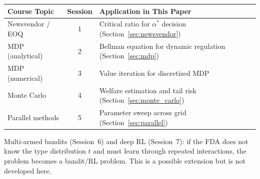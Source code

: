 \documentclass[12pt,a4paper]{article}
\begin{document}
\begin{center}
\renewcommand{\arraystretch}{1.3}
\begin{tabular}{l|c|l}
\textbf{Course Topic} & \textbf{Session}
  & \textbf{Application in This Paper} \\ \hline
Newsvendor / EOQ & 1
  & Critical ratio for $\alpha^*$ decision
    (Section~\ref{sec:newsvendor}) \\
MDP (analytical) & 2
  & Bellman equation for dynamic regulation
    (Section~\ref{sec:mdp}) \\
MDP (numerical) & 3
  & Value iteration for discretized MDP \\
Monte Carlo & 4
  & Welfare estimation and tail risk
    (Section~\ref{sec:monte_carlo}) \\
Parallel methods & 5
  & Parameter sweep across grid
    (Section~\ref{sec:parallel}) \\
\end{tabular}
\end{center}

Multi-armed bandits (Session~6) and deep RL (Session~7):
if the FDA does not know the type distribution $t$ and
must learn through repeated interactions, the problem
becomes a bandit/RL problem. This is a possible extension
but is not developed here.
\end{document}

